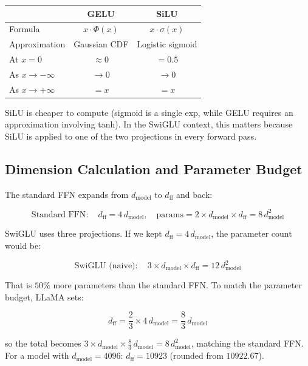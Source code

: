 \begin{center}
\begin{tabular}{lcc}
\toprule
 & \textbf{GELU} & \textbf{SiLU} \\
\midrule
Formula & $x \cdot \Phi(x)$ & $x \cdot \sigma(x)$ \\
Approximation & Gaussian CDF & Logistic sigmoid \\
At $x = 0$ & $\approx 0$ & $= 0.5$ \\
As $x \to -\infty$ & $\to 0$ & $\to 0$ \\
As $x \to +\infty$ & $= x$ & $= x$ \\
\bottomrule
\end{tabular}
\end{center}

SiLU is cheaper to compute (sigmoid is a single exp, while GELU requires an
approximation involving tanh). In the SwiGLU context, this matters because
SiLU is applied to one of the two projections in every forward pass.

\subsection{Dimension Calculation and Parameter Budget}

The standard FFN expands from $d_{\text{model}}$ to $d_{\text{ff}}$ and back:

\[
  \text{Standard FFN}: \quad d_{\text{ff}} = 4\,d_{\text{model}}, \quad
  \text{params} = 2 \times d_{\text{model}} \times d_{\text{ff}} = 8\,d_{\text{model}}^2
\]

SwiGLU uses three projections. If we kept $d_{\text{ff}} = 4\,d_{\text{model}}$,
the parameter count would be:

\[
  \text{SwiGLU (naive)}: \quad 3 \times d_{\text{model}} \times d_{\text{ff}} = 12\,d_{\text{model}}^2
\]

That is $50\%$ more parameters than the standard FFN. To match the parameter
budget, LLaMA sets:

\[
  d_{\text{ff}} = \frac{2}{3} \times 4\,d_{\text{model}} = \frac{8}{3}\,d_{\text{model}}
\]

so the total becomes $3 \times d_{\text{model}} \times \frac{8}{3}\,d_{\text{model}}
= 8\,d_{\text{model}}^2$, matching the standard FFN. For a model with
$d_{\text{model}} = 4096$: $d_{\text{ff}} = 10923$ (rounded from $10922.67$).


